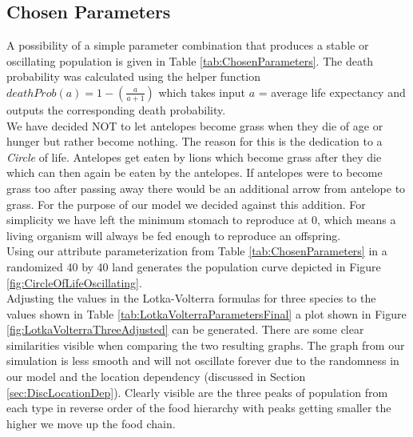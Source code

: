 \documentclass[11pt]{article}
\begin{document}
\subsection{Chosen Parameters}
A possibility of a simple parameter combination that produces a stable or oscillating population is given in Table \ref{tab:ChosenParameters}.
The death probability was calculated using the helper function $deathProb(a) = 1-(\frac{a}{a+1})$ which takes input $a$ = average life expectancy and outputs the corresponding death probability.\\
We have decided NOT to let antelopes become grass when they die of age or hunger but rather become nothing. The reason for this is the dedication to a {\it Circle} of life. Antelopes get eaten by lions which become grass after they die which can then again be eaten by the antelopes. If antelopes were to become grass too after passing away there would be an additional arrow from antelope to grass. For the purpose of our model we decided against this addition. For simplicity we have left the minimum stomach to reproduce at 0, which means a living organism will always be fed enough to reproduce an offspring.\\
Using our attribute parameterization from Table \ref{tab:ChosenParameters} in a randomized 40 by 40 land generates the population curve depicted in Figure \ref{fig:CircleOfLifeOscillating}.\\
Adjusting the values in the Lotka-Volterra formulas for three species to the values shown in Table \ref{tab:LotkaVolterraParametersFinal} a plot shown in Figure \ref{fig:LotkaVolterraThreeAdjusted} can be generated. 
There are some clear similarities visible when comparing the two resulting graphs. The graph from our simulation is less smooth and will not oscillate forever due to the randomness in our model and the location dependency (discussed in Section \ref{sec:DiscLocationDep}). Clearly visible are the three peaks of population from each type in reverse order of the food hierarchy with peaks getting smaller the higher we move up the food chain. 
\end{document}
